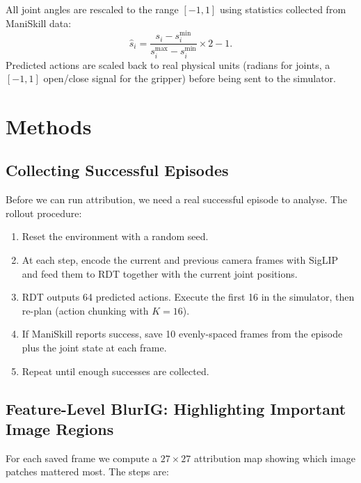 \documentclass[11pt,a4paper]{article}
\begin{document}
All joint angles are rescaled to the range $[-1, 1]$ using statistics
collected from ManiSkill data:
\begin{equation}
    \hat{s}_i = \frac{s_i - s_i^{\min}}{s_i^{\max} - s_i^{\min}} \times 2 - 1.
\end{equation}
Predicted actions are scaled back to real physical units (radians for joints,
a $[-1, 1]$ open/close signal for the gripper) before being sent to the
simulator.

\section{Methods}

\subsection{Collecting Successful Episodes}

Before we can run attribution, we need a real successful episode to analyse.
The rollout procedure:
\begin{enumerate}
    \item Reset the environment with a random seed.
    \item At each step, encode the current and previous camera frames with
          SigLIP and feed them to RDT together with the current joint positions.
    \item RDT outputs 64 predicted actions. Execute the first 16 in the
          simulator, then re-plan (action chunking with $K=16$).
    \item If ManiSkill reports success, save 10 evenly-spaced frames from the
          episode plus the joint state at each frame.
    \item Repeat until enough successes are collected.
\end{enumerate}

\subsection{Feature-Level BlurIG: Highlighting Important Image Regions}

For each saved frame we compute a $27 \times 27$ attribution map showing which
image patches mattered most. The steps are:
\end{document}
